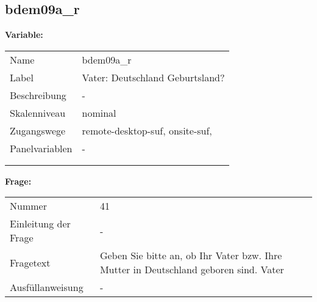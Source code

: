 	
	
	\subsection{bdem09a\_r}
	\label{subSection:bdem09a_r}

	\noindent\textbf{Variable:}\\
		\begin{tabular}{lL{11.3cm}}
			\label{tableVariable:bdem09a_r}
			Name & bdem09a\_r \\
			Label & Vater: Deutschland Geburtsland?  \\
			Beschreibung & - \\
			Skalenniveau & nominal \\
			Zugangswege &
				remote-desktop-suf,
				onsite-suf,
 \\
			Panelvariablen & -
			 \\
			 \\
 \\
		\end{tabular}

		\vspace*{1 cm}
		\noindent\textbf{Frage:}\\
		\begin{tabular}{lL{11.3cm}}
			\label{tableQuestion:bdem09a_r}
			Nummer & 41 \\
			Einleitung der Frage & - \\
			Fragetext & Geben Sie bitte an, ob Ihr Vater bzw. Ihre Mutter in Deutschland geboren sind.
Vater \\
			Ausfüllanweisung & - \\
		\end{tabular}





